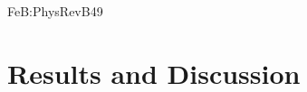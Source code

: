 \documentclass{WileyMSP-template}
\begin{document}
FeB:PhysRevB49




%
%







%
%
%
%


\section{Results and Discussion}
\end{document}
